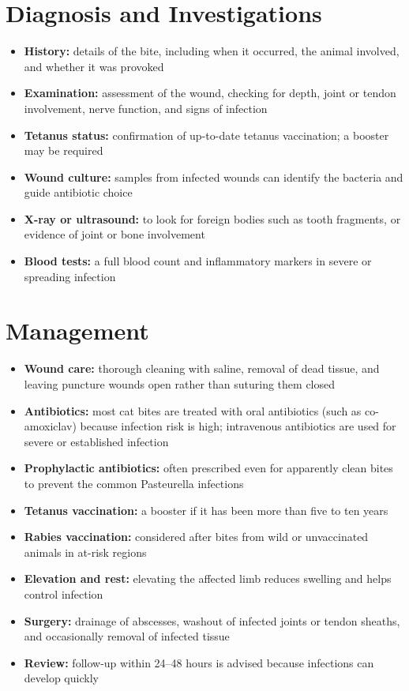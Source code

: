 \section*{Diagnosis and Investigations}
\begin{itemize}
    \item \textbf{History:} details of the bite, including when it occurred, the animal involved, and whether it was provoked
    \item \textbf{Examination:} assessment of the wound, checking for depth, joint or tendon involvement, nerve function, and signs of infection
    \item \textbf{Tetanus status:} confirmation of up-to-date tetanus vaccination; a booster may be required
    \item \textbf{Wound culture:} samples from infected wounds can identify the bacteria and guide antibiotic choice
    \item \textbf{X-ray or ultrasound:} to look for foreign bodies such as tooth fragments, or evidence of joint or bone involvement
    \item \textbf{Blood tests:} a full blood count and inflammatory markers in severe or spreading infection
\end{itemize}

\section*{Management}
\begin{itemize}
    \item \textbf{Wound care:} thorough cleaning with saline, removal of dead tissue, and leaving puncture wounds open rather than suturing them closed
    \item \textbf{Antibiotics:} most cat bites are treated with oral antibiotics (such as co-amoxiclav) because infection risk is high; intravenous antibiotics are used for severe or established infection
    \item \textbf{Prophylactic antibiotics:} often prescribed even for apparently clean bites to prevent the common Pasteurella infections
    \item \textbf{Tetanus vaccination:} a booster if it has been more than five to ten years
    \item \textbf{Rabies vaccination:} considered after bites from wild or unvaccinated animals in at-risk regions
    \item \textbf{Elevation and rest:} elevating the affected limb reduces swelling and helps control infection
    \item \textbf{Surgery:} drainage of abscesses, washout of infected joints or tendon sheaths, and occasionally removal of infected tissue
    \item \textbf{Review:} follow-up within 24--48 hours is advised because infections can develop quickly
\end{itemize}

